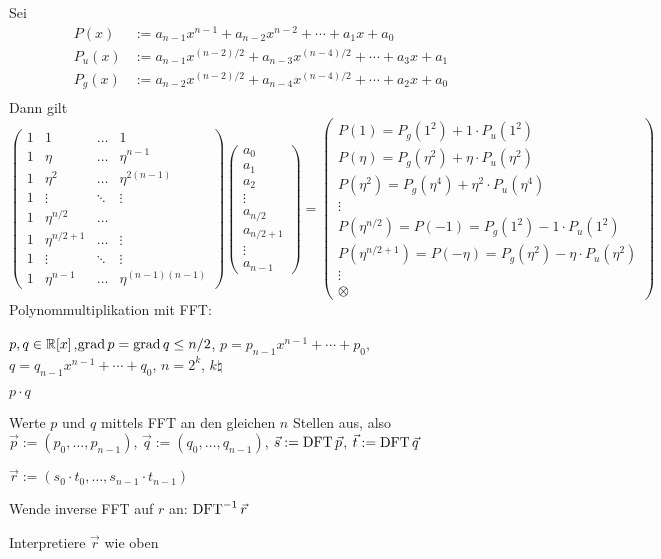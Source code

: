{  Sei 
  \begin{align*}
    P(x)  &:=a_{n-1}x^{n-1}+a_{n-2}x^{n-2}+\cdots+a_1x+a_0 \\
    P_u(x)&:=a_{n-1}x^{(n-2)/2}+a_{n-3}x^{(n-4)/2}+\cdots+a_3x+a_1 \\
    P_g(x)&:=a_{n-2}x^{(n-2)/2}+a_{n-4}x^{(n-4)/2}+\cdots+a_2x+a_0 \\
  \end{align*}
  Dann gilt
  \[
    \begin{pmatrix}
      1 & 1 & \hdots & 1 \\
      1 & \eta & \hdots & \eta^{n-1} \\
      1 & \eta^2 & \hdots & \eta^{2(n-1)} \\
      1 & \vdots & \ddots & \vdots \\
      1 & \eta^{n/2} & \hdots \\
      1 & \eta^{n/2+1} & \hdots & \vdots \\
      1 & \vdots & \ddots & \vdots \\
      1 & \eta^{n-1} & \hdots & \eta^{(n-1)(n-1)}
    \end{pmatrix}
    \begin{pmatrix}
      a_0 \\ a_1 \\ a_2 \\ \vdots \\ a_{n/2} \\ a_{n/2+1} \\\vdots \\ a_{n-1} 
    \end{pmatrix}
    =
    \begin{pmatrix}
      P(1)=P_g(1^2)+1\cdot P_u(1^2) \\
      P(\eta)=P_g(\eta^2)+\eta\cdot P_u(\eta^2) \\
      P(\eta^2)=P_g(\eta^4)+\eta^2\cdot P_u(\eta^4) \\
      \vdots \\
      P(\eta^{n/2})=P(-1)=P_g(1^2)-1\cdot P_u(1^2) \\
      P(\eta^{n/2+1})=P(-\eta)=P_g(\eta^2)-\eta\cdot P_u(\eta^2) \\
      \vdots \\
      \otimes 
    \end{pmatrix}
  \]
}
\algorithm Polynommultiplikation mit FFT:{
  \given $p,q\in\mathbb R[x]$,$\operatorname{grad} p=\operatorname{grad} q\le n/2$, 
    $p=p_{n-1}x^{n-1}+\cdots+p_0$,
    $q=q_{n-1}x^{n-1}+\cdots+q_0$, $n=2^k$, $k\natural$
  
  \aim $p\cdot q$
  
  \begin{proc}
    \item Werte $p$ und $q$ mittels FFT an den gleichen $n$ Stellen aus, also
      $\vec p:=(p_0,\ldots,p_{n-1})$, $\vec q:=(q_0,\ldots,q_{n-1})$,
      $\vec s:=\operatorname{DFT} \vec p$, $\vec t:=\operatorname{DFT} \vec q$
    \item $\vec r:=(s_0\cdot t_0,\ldots, s_{n-1}\cdot t_{n-1})$
    \item Wende inverse FFT auf $r$ an: $\operatorname{DFT}^{-1}\vec r$
    \item Interpretiere $\vec r$ wie oben
  \end{proc}
}
